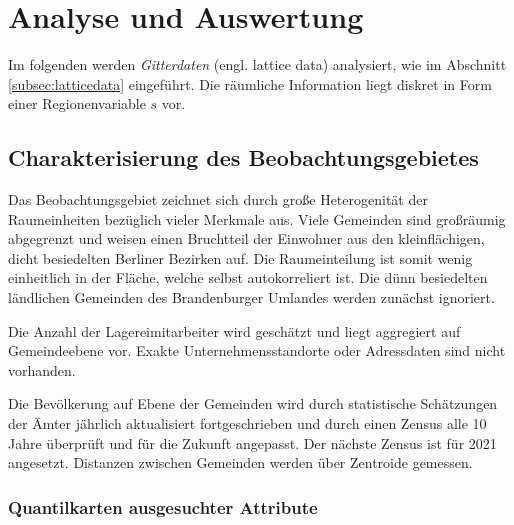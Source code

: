 \chapter{Analyse und Auswertung}
\label{ch:analysis}

Im folgenden werden \emph{Gitterdaten} (engl. lattice data) analysiert, wie im Abschnitt \ref{subsec:latticedata} eingeführt. 
Die räumliche Information liegt diskret in Form einer Regionenvariable $s$ vor.  


    

\section{Charakterisierung des Beobachtungsgebietes}

Das Beobachtungsgebiet zeichnet sich durch große Heterogenität der Raumeinheiten bezüglich vieler Merkmale aus. 
Viele Gemeinden sind großräumig abgegrenzt und weisen einen Bruchtteil der Einwohner aus den kleinflächigen, 
dicht besiedelten Berliner Bezirken auf. 
Die Raumeinteilung ist somit wenig einheitlich in der Fläche, 
welche selbst autokorreliert ist.
Die dünn besiedelten ländlichen Gemeinden des Brandenburger Umlandes werden zunächst ignoriert.

Die Anzahl der Lagereimitarbeiter wird geschätzt und liegt aggregiert auf Gemeindeebene vor. 
Exakte Unternehmensstandorte oder Adressdaten sind nicht vorhanden.

Die Bevölkerung auf Ebene der Gemeinden wird durch statistische Schätzungen der Ämter jährlich aktualisiert 
fortgeschrieben und durch einen Zensus alle 10 Jahre überprüft und für die Zukunft angepasst. 
Der nächste Zensus ist für 2021 angesetzt. Distanzen zwischen Gemeinden werden über Zentroide gemessen.

\subsection{Quantilkarten ausgesuchter Attribute}

